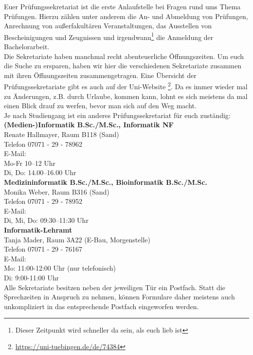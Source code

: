 Euer Prüfungssekretariat ist die erste Anlaufstelle bei Fragen rund ums Thema Prüfungen. Hierzu zählen unter anderem die An- und Abmeldung von Prüfungen, Anrechnung von außerfakultären Veranstaltungen,
das Ausstellen von Bescheinigungen und Zeugnissen und irgendwann\footnote{Dieser Zeitpunkt wird schneller da sein, als euch lieb ist} die Anmeldung der Bachelorarbeit.\\
Die Sekretariate haben manchmal recht abenteuerliche Öffnungszeiten. Um euch die Suche zu ersparen, haben wir hier die verschiedenen Sekretariate zusammen mit ihren Öffnungszeiten zusammengetragen. Eine Übersicht der Prüfungssekretariate gibt es auch auf der Uni-Website \footnote{\url{https://uni-tuebingen.de/de/74384}}. Da es immer wieder mal zu Änderungen, z.B. durch Urlaube, kommen kann, lohnt es sich meistens da mal einen Blick drauf zu werfen, bevor man sich auf den Weg macht.\\
Je nach Studiengang ist ein anderes Prüfungssekretariat für euch zuständig: \\


\textbf{(Medien-)Informatik B.Sc./M.Sc., Informatik NF}\\
Renate Hallmayer, Raum B118 (Sand)\\
Telefon 07071 - 29 - 78962\\
E-Mail: \\
Mo-Fr 10–12 Uhr\\
Di, Do: 14.00–16.00 Uhr\\

\textbf{Medizininformatik B.Sc./M.Sc., Bioinformatik B.Sc./M.Sc.}\\ 
Monika Weber, Raum B316 (Sand)\\
Telefon 07071 - 29 - 78952\\
E-Mail: \\
Di, Mi, Do: 09:30–11:30 Uhr\\

\textbf{Informatik-Lehramt}\\
Tanja Mader, Raum 3A22 (E-Bau, Morgenstelle)\\
Telefon 07071 - 29 - 76167\\
E-Mail: \\
Mo: 11:00-12:00 Uhr (nur telefonisch)\\
Di: 9:00-11:00 Uhr\\

Alle Sekretariate besitzen neben der jeweiligen Tür ein Postfach. Statt die Sprechzeiten in Anspruch zu nehmen, können Formulare daher meistens auch unkompliziert in das entsprechende Postfach eingeworfen werden.\\
